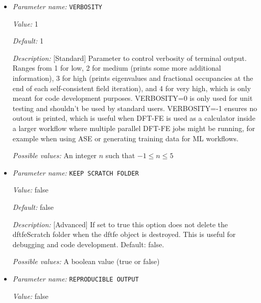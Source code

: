 \begin{itemize}
{\it Value:} false


{\it Default:} false


{\it Description:} [Standard] Use GPU for compute.


{\it Possible values:} A boolean value (true or false)
\item {\it Parameter name:} {\tt VERBOSITY}
\label{parameters:VERBOSITY}


{\it Value:} 1


{\it Default:} 1


{\it Description:} [Standard] Parameter to control verbosity of terminal output. Ranges from 1 for low, 2 for medium (prints some more additional information), 3 for high (prints eigenvalues and fractional occupancies at the end of each self-consistent field iteration), and 4 for very high, which is only meant for code development purposes. VERBOSITY=0 is only used for unit testing and shouldn't be used by standard users. VERBOSITY=-1 ensures no outout is printed, which is useful when DFT-FE is used as a calculator inside a larger workflow where multiple parallel DFT-FE jobs might be running, for example when using ASE or generating training data for ML workflows.


{\it Possible values:} An integer $n$ such that $-1\leq n \leq 5$

\item {\it Parameter name:} {\tt KEEP SCRATCH FOLDER}
\label{parameters:KEEP SCRATCH FOLDER}
\label{parameters:KEEP_20SCRATCH_20FOLDER}


{\it Value:} false


{\it Default:} false


{\it Description:} [Advanced] If set to true this option does not delete the dftfeScratch folder when the dftfe object is destroyed. This is useful for debugging and code development. Default: false.


{\it Possible values:} A boolean value (true or false)
\item {\it Parameter name:} {\tt REPRODUCIBLE OUTPUT}
\label{parameters:REPRODUCIBLE OUTPUT}
\label{parameters:REPRODUCIBLE_20OUTPUT}


{\it Value:} false



\end{itemize}
